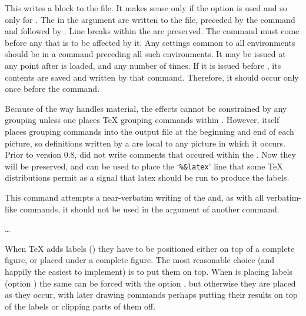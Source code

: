 \documentclass[letterpaper]{article}
\begin{document}
This writes a  block to the  file. It makes
sense only if the  option is used and so only for \MP{}.
The  in the argument are written to the 
file, preceded by the \MP{} command  and followed by
. Line breaks within the  are preserved. The
 command must come before any  that is to be
affected by it. Any settings common to all  environments
should be in a  command preceding all such environments.
It may be issued at any point after \mfp{} is loaded, and any number of
times. If it is issued before , its contents are
saved and written by that command. Therefore, it should occur only once
before the  command.

Because of the way \MP{} handles  material, the effects
cannot be constrained by any grouping unless one places \TeX{} grouping
commands within . However, \mfp{} itself places
grouping commands into the output file at the beginning and end of each
picture, so definitions written by a  are local to any
picture in which it occurs.  Prior to version 0.8, \mfp{} did not write
comments that occured within the . Now they will be
preserved, and can be used to place the `\verb$%&latex$' line that some
\TeX{} distributions permit as a signal that latex should be run to
produce the labels.

This command attempts a near-verbatim writing of the 
and, as with all verbatim-like commands, it should not be used in the
argument of another command.

\begin{cd}
 \dots {}%
%
\end{cd}

When \TeX{} adds labels () they have to be positioned
either on top of a complete figure, or placed under a complete figure.
The most reasonable choice (and happily the easiest to implement) is to
put them on top. When \MP{} is placing labels (option ) the
same can be forced with the option , but otherwise
they are placed as they occur, with later drawing commands perhaps
putting their results on top of the labels or clipping parts of them off.
\end{document}
